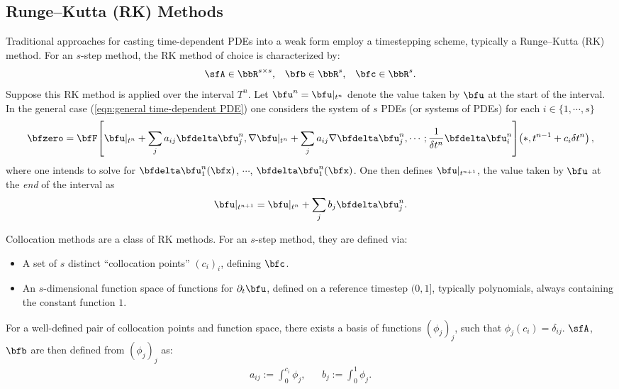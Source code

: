 \subsection{Runge--Kutta (RK) Methods}\label{cha:RK methods}
    Traditional approaches for casting time-dependent PDEs into a weak form employ a timestepping scheme, typically a Runge--Kutta (RK) method. For an $s$-step method, the RK method of choice is characterized by:
    \begin{align}
        \sfA  \in  \bbR^{s \times s},  &&
        \bfb  \in  \bbR^{s},  &&
        \bfc  \in  \bbR^{s}.
    \end{align}
    Suppose this RK method is applied over the interval $T^{n}$. Let $\bfu^{n}  =  \bfu|_{t^{n}}$ denote the value taken by $\bfu$ at the start of the interval. In the general case (\ref{eqn:general time-dependent PDE}) one considers the system of $s$ PDEs (or systems of PDEs) for each $i  \in  \{1, \cdots, s\}$ 
    \begin{equation}
        \bfzero  =  \bfF\!\left[\bfu|_{t^{n}} + \sum_{j}a_{ij}\bfdelta\bfu^{n}_{j}, \nabla\bfu|_{t^{n}} + \sum_{j}a_{ij}\nabla\bfdelta\bfu^{n}_{j}, \cdots; \frac{1}{\delta t^{n}}\bfdelta\bfu^{n}_{i}\right]\!\left(*, t^{n - 1} + c_{i}\delta t^{n}\right),
    \end{equation}
    where one intends to solve for $\bfdelta\bfu^{n}_{1}(\bfx)$, $\cdots$, $\bfdelta\bfu^{n}_{1}(\bfx)$. One then defines $\bfu|_{t^{n + 1}}$, the value taken by $\bfu$ at the \emph{end} of the interval as
    \begin{equation}
        \bfu|_{t^{n + 1}}  =  \bfu|_{t^{n}} + \sum_{j}b_{j}\bfdelta\bfu^{n}_{j}.
    \end{equation}

    \line
    
    \begin{definition}
        Collocation methods are a class of RK methods. For an $s$-step method, they are defined via:
        \begin{itemize}
            \item  A set of $s$ distinct ``collocation points'' $(c_{i})_{i}$, defining $\bfc$.
            \item  An $s$-dimensional function space of functions for $\partial_{t}\bfu$, defined on a reference timestep $(0, 1]$, typically polynomials, always containing the constant function $1$.
        \end{itemize}
        For a well-defined pair of collocation points and function space, there exists a basis of functions $(\phi_{j})_{j}$, such that $\phi_{j}(c_{i})  =  \delta_{ij}$. $\sfA$, $\bfb$ are then defined from $(\phi_{j})_{j}$ as:
        \begin{align}
            a_{ij}  :=  \int_{0}^{c_{i}}\phi_{j},  &&
            b_{j}   :=  \int_{0}^{1}\phi_{j}.
        \end{align}
    \end{definition}
    
